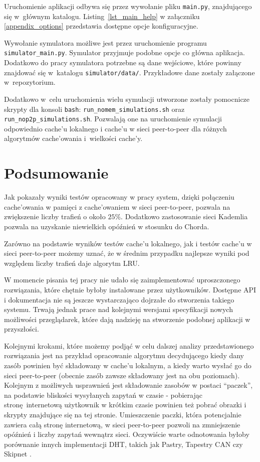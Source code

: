 \documentclass[a4paper,11pt]{scrartcl}
\newcommand{\f}{\texttt}
\newcommand{\s}{ }
\newcommand{\keszy}{cache'y}
\newcommand{\keszu}{cache'u}
\newcommand{\keszowania}{cache'owania}
\newcommand{\keszowaniem}{cache'owaniem}
\begin{document}
Uruchomienie aplikacji odbywa się przez wywołanie pliku \f{main.py}, znajdującego się w~głównym katalogu. Listing~\ref{lst_main_help} w załączniku \ref{appendix_options} przedstawia dostępne opcje konfiguracyjne.

Wywołanie symulatora możliwe jest przez uruchomienie programu \f{simulator\_main.py}. Symulator przyjmuje podobne opcje co główna aplikacja. Dodatkowo do pracy symulatora potrzebne są dane wejściowe, które powinny znajdować się w~katalogu \f{simulator/data/}. Przykładowe dane zostały załączone w~repozytorium.

Dodatkowo w~celu uruchomienia wielu symulacji utworzone zostały pomocnicze skrypty dla konsoli \f{bash}: \f{run\_nomem\_simulations.sh} oraz \f{run\_nop2p\_simulations.sh}. Pozwalają one na uruchomienie symulacji odpowiednio \keszu\s lokalnego i \keszu\s w sieci peer-to-peer dla różnych algorytmów \keszowania\s i~wielkości \keszy.


\section{Podsumowanie}

Jak pokazały wyniki testów opracowany w pracy system, dzięki połączeniu \keszowania\s w pamięci z \keszowaniem\s w sieci peer-to-peer, pozwala na zwiększenie liczby trafień o około $25\%$. Dodatkowo zastosowanie sieci Kademlia pozwala na uzyskanie niewielkich opóźnień w stosunku do Chorda. 

Zarówno na podstawie wyników testów \keszu\s lokalnego, jak i testów \keszu\s w sieci peer-to-peer możemy uznać, że w średnim przypadku najlepsze wyniki pod względem liczby trafień daje algorytm LRU.

W momencie pisania tej pracy nie udało się zaimplementować uproszczonego rozwiązania, które chętnie byłoby instalowane przez użytkowników. Dostępne API i dokumentacja nie są jeszcze wystarczająco dojrzałe do stworzenia takiego systemu. Trwają jednak prace nad kolejnymi wersjami specyfikacji nowych możliwości przeglądarek, które dają nadzieję na stworzenie podobnej aplikacji w przyszłości.

Kolejnymi krokami, które możemy podjąć w celu dalszej analizy przedstawionego rozwiązania jest na przykład opracowanie algorytmu decydującego kiedy dany zasób powinien być składowany w \keszu\s lokalnym, a kiedy warto wysłać go do sieci peer-to-peer (obecnie zasób zawsze składowany jest na obu poziomach). Kolejnym z możliwych usprawnień jest składowanie zasobów w postaci ``paczek'', na podstawie bliskości wysyłanych zapytań w czasie - pobierając stronę internetową użytkownik w krótkim czasie powinien też pobrać obrazki i skrypty znajdujące się na tej stronie. Umieszczenie paczki, która potencjalnie zawiera całą stronę internetową, w sieci peer-to-peer pozwoli na zmniejszenie opóźnień i liczby zapytań wewnątrz sieci. Oczywiście warte odnotowania byłoby porównanie innych implementacji DHT, takich jak Pastry, Tapestry CAN czy Skipnet \cite{harvey2003skipnet}. 
\end{document}
